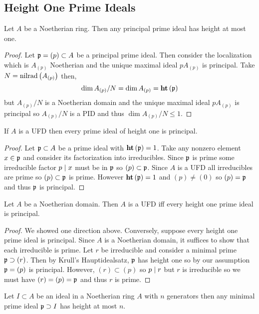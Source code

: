 \documentclass[12pt]{article}
\begin{document}
\subsection{Height One Prime Ideals}

\begin{proposition}
Let $A$ be a Noetherian ring. Then any principal prime ideal has height at most one.
\end{proposition}

\begin{proof}
Let $\mathfrak{p} = (p) \subset A$ be a principal prime ideal. Then consider the localization which is $A_{(p)}$ Noetherian and the unique maximal ideal $p A_{(p)}$ is principal. Take $N = \mathrm{nilrad}\left( A_{(p)} \right)$ then,
\[ \dim{A_{(p)}/N} = \dim{A_{(p)}} = \mathbf{ht}\left( \mathfrak{p} \right) \]
but $A_{(p)} / N$ is a Noetherian domain and the unique maximal ideal $p A_{(p)}$ is principal so $A_{(p)} / N$ is a PID and thus $\dim{A_{(p)} / N} \le 1$. 
\end{proof}

\begin{proposition}
If $A$ is a UFD then every prime ideal of height one is principal.
\end{proposition}

\begin{proof}
Let $\mathfrak{p} \subset A$ be a prime ideal with $\mathbf{ht}\left( \mathfrak{p} \right) = 1$. Take any nonzero element $x \in \mathfrak{p}$ and consider its factorization into irreducibles. Since $\mathfrak{p}$ is prime some irreducible factor $p \mid x$ must be in $\mathfrak{p}$ so $(p) \subset \mathfrak{p}$. Since $A$ is a UFD all irreducibles are prime so $(p) \subset \mathfrak{p}$ is prime. However $\mathbf{ht}\left( \mathfrak{p} \right) = 1$ and $(p) \neq (0)$ so $(p) = \mathfrak{p}$ and thus $\mathfrak{p}$ is principal.
\end{proof}

\begin{theorem}
Let $A$ be a Noetherian domain. Then $A$ is a UFD iff every height one prime ideal is principal. 
\end{theorem}

\begin{proof}
We showed one direction above. Conversely, suppose every height one prime ideal is principal. Since $A$ is a Noetherian domain, it suffices to show that each irreducible is prime. Let $r$ be irreducible and consider a minimal prime $\mathfrak{p} \supset (r)$. Then by Krull's Hauptidealsatz, $\mathfrak{p}$ has height one so by our assumption $\mathfrak{p} = (p)$ is principal. However, $(r) \subset (p)$ so $p \mid r$ but $r$ is irreducible so we must have $(r) = (p) = \mathfrak{p}$ and thus $r$ is prime.
\end{proof}

\begin{theorem}
Let $I \subset A$ be an ideal in a Noetherian ring $A$ with $n$ generators then any minimal prime ideal $\mathfrak{p} \supset I$ has height at most $n$.
\end{theorem}
\end{document}
